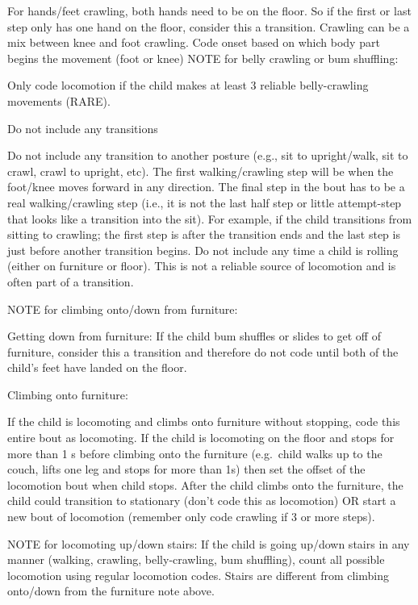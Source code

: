\documentclass[
]{book}
\begin{document}
For hands/feet crawling, both hands need to be on the floor. So if the first or last step only has one hand on the floor, consider this a transition.
Crawling can be a mix between knee and foot crawling. Code onset based on which body part begins the movement (foot or knee)
NOTE for belly crawling or bum shuffling:

Only code locomotion if the child makes at least 3 reliable belly-crawling movements (RARE).

Do not include any transitions

Do not include any transition to another posture (e.g., sit to upright/walk, sit to crawl, crawl to upright, etc). The first walking/crawling step will be when the foot/knee moves forward in any direction. The final step in the bout has to be a real walking/crawling step (i.e., it is not the last half step or little attempt-step that looks like a transition into the sit). For example, if the child transitions from sitting to crawling; the first step is after the transition ends and the last step is just before another transition begins.
Do not include any time a child is rolling (either on furniture or floor). This is not a reliable source of locomotion and is often part of a transition.

NOTE for climbing onto/down from furniture:

Getting down from furniture: If the child bum shuffles or slides to get off of furniture, consider this a transition and therefore do not code until both of the child's feet have landed on the floor.

Climbing onto furniture:

If the child is locomoting and climbs onto furniture without stopping, code this entire bout as locomoting.
If the child is locomoting on the floor and stops for more than 1 s before climbing onto the furniture (e.g.~child walks up to the couch, lifts one leg and stops for more than 1s) then set the offset of the locomotion bout when child stops. After the child climbs onto the furniture, the child could transition to stationary (don't code this as locomotion) OR start a new bout of locomotion (remember only code crawling if 3 or more steps).

NOTE for locomoting up/down stairs:
If the child is going up/down stairs in any manner (walking, crawling, belly-crawling, bum shuffling), count all possible locomotion using regular locomotion codes. Stairs are different from climbing onto/down from the furniture note above.
\end{document}
